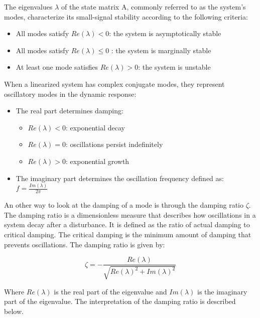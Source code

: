 The eigenvalues $\lambda$ of the state matrix A, commonly referred to as the system's modes, characterize its small-signal stability according to the following criteria:

\begin{itemize}
  \item All modes satisfy $Re(\lambda) < 0$: the system is asymptotically stable
  \item All modes satisfy $Re(\lambda) \leq 0$ : the system is marginally stable
  \item At least one mode satisfies $Re(\lambda) > 0$: the system is unstable
\end{itemize}

When a linearized system has complex conjugate modes, they represent oscillatory modes in the dynamic response:

\begin{itemize}
  \item The real part determines damping:
  \begin{itemize}
    \item $Re(\lambda) < 0$: exponential decay
    \item $Re(\lambda) = 0$: oscillations persist indefinitely
    \item $Re(\lambda) > 0$: exponential growth
  \end{itemize}
  \item The imaginary part determines the oscillation frequency defined as: $f = \frac{Im(\lambda)}{2\pi}$
\end{itemize}

An other way to look at the damping of a mode is through the damping ratio $\zeta$. The damping ratio is a dimensionless measure that describes how oscillations 
in a system decay after a disturbance. It is defined as the ratio of actual damping to critical damping. The critical damping is the minimum amount of damping that prevents oscillations. 
The damping ratio is given by: 

\begin{equation}
  \zeta = -  \frac{Re(\lambda)}{\sqrt{Re(\lambda)^2+Im(\lambda)^2}}
\end{equation}

Where $Re(\lambda)$ is the real part of the eigenvalue and $Im(\lambda)$ is the imaginary part of the eigenvalue. The interpretation of the damping ratio is described below.

